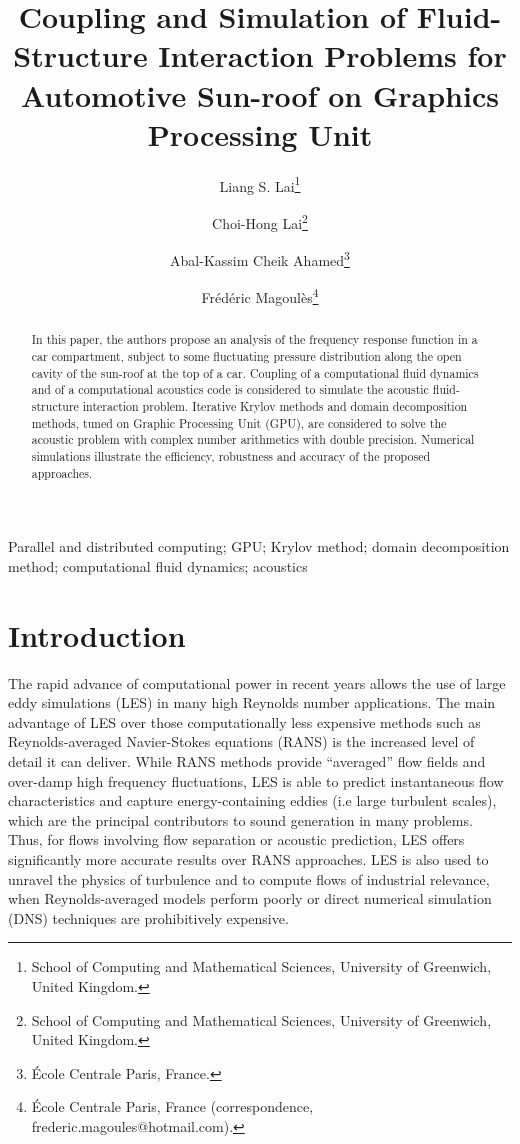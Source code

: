 \documentclass[10pt]{article}
\author{
  {\normalsize Liang S. Lai}\thanks{School of Computing and Mathematical Sciences, University of Greenwich, United Kingdom.}
	\and
	{\normalsize Choi-Hong Lai}\thanks{School of Computing and Mathematical Sciences, University of Greenwich, United Kingdom.}
	\and
  {\normalsize Abal-Kassim Cheik Ahamed}\thanks{\'Ecole Centrale Paris, France.}
	\and
  {\normalsize Fr\'ed\'eric Magoul\`es}\thanks{\'Ecole Centrale Paris, France
    (correspondence, frederic.magoules@hotmail.com).}
		}
\title{Coupling and Simulation of Fluid-Structure Interaction Problems for Automotive Sun-roof on Graphics Processing Unit}
\date{}
\theoremstyle{plain}
\theoremstyle{definition}
\theoremstyle{remark}
\begin{document}
\maketitle
\thispagestyle{fancy}

\begin{abstract}
\noindent  In this paper, the authors propose an analysis of the frequency response function in a car compartment, subject to some fluctuating pressure distribution along the open cavity of the sun-roof at the top of a car.
Coupling of a computational fluid dynamics and of a computational acoustics code is considered to simulate the acoustic fluid-structure interaction problem.
Iterative Krylov methods and domain decomposition methods, tuned on Graphic Processing Unit (GPU), are considered to solve the acoustic problem with complex number arithmetics with double precision.
Numerical simulations illustrate the efficiency, robustness and accuracy of the proposed approaches.
\end{abstract}

\begin{keywords}
Parallel and distributed computing; GPU; Krylov method; domain decomposition method; computational fluid dynamics; acoustics
\end{keywords}



\section{Introduction}

The rapid advance of computational power in recent years allows the use of large eddy simulations (LES) in many high Reynolds number applications.
The main advantage of LES over those computationally less expensive methods such as Reynolds-averaged Navier-Stokes equations (RANS) is the increased level of detail it can deliver.
While RANS methods provide ``averaged'' flow fields and over-damp high frequency fluctuations, LES is able to predict instantaneous flow characteristics and capture energy-containing eddies (i.e large turbulent scales), which are the principal contributors to sound generation in many problems.
Thus, for flows involving flow separation or acoustic prediction, LES offers significantly more accurate results over RANS approaches.
LES is also used to unravel the physics of turbulence and to compute flows of industrial relevance, when Reynolds-averaged models perform poorly or direct numerical simulation (DNS) techniques are prohibitively expensive.
\end{document}
